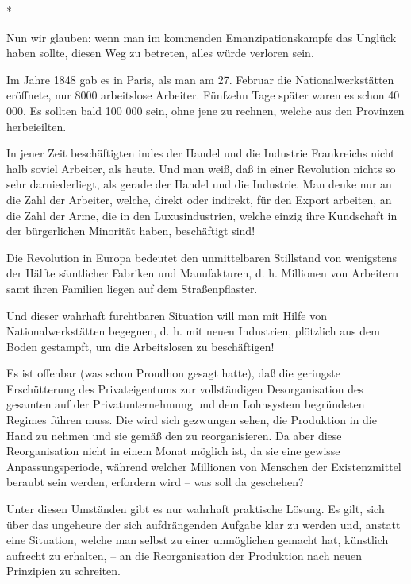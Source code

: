 \documentclass{scrbook}
\begin{document}
\begin{center}*\end{center}

Nun wir glauben: wenn man im kommenden Emanzipationskampfe das Unglück haben sollte, diesen Weg zu betreten, alles würde verloren sein.

Im Jahre 1848 gab es in Paris, als man am 27. Februar die Nationalwerkstätten eröffnete, nur 8000 arbeitslose Arbeiter. Fünfzehn Tage später waren es schon 40 000. Es sollten bald 100 000 sein, ohne jene zu rechnen, welche aus den Provinzen herbeieilten.

In jener Zeit beschäftigten indes der Handel und die Industrie Frankreichs nicht halb soviel Arbeiter, als heute. Und man weiß, daß in einer Revolution nichts so sehr darniederliegt, als gerade der Handel und die Industrie. Man denke nur an die Zahl der Arbeiter, welche, direkt oder indirekt, für den Export arbeiten, an die Zahl der Arme, die in den Luxusindustrien, welche einzig ihre Kundschaft in der bürgerlichen Minorität haben, beschäftigt sind!

Die Revolution in Europa bedeutet den unmittelbaren Stillstand von wenigstens der Hälfte sämtlicher Fabriken und Manufakturen, d. h. Millionen von Arbeitern samt ihren Familien liegen auf dem Straßenpflaster.

Und dieser wahrhaft furchtbaren Situation will man mit Hilfe von Nationalwerkstätten begegnen, d. h. mit neuen Industrien, plötzlich aus dem Boden gestampft, um die Arbeitslosen zu beschäftigen!

Es ist offenbar (was schon Proudhon gesagt hatte), daß die geringste Erschütterung des Privateigentums zur vollständigen Desorganisation des gesamten auf der Privatunternehmung und dem Lohnsystem begründeten Regimes führen muss. Die  wird sich gezwungen sehen, die  Produktion  in die Hand zu nehmen und sie gemäß den  zu reorganisieren. Da aber diese Reorganisation nicht in einem Monat möglich ist, da sie eine gewisse Anpassungsperiode, während welcher Millionen von Menschen der Existenzmittel beraubt sein werden, erfordern wird – was soll da geschehen?

Unter diesen Umständen gibt es nur  wahrhaft praktische Lösung. Es gilt, sich über das ungeheure der sich aufdrängenden Aufgabe klar zu werden und, anstatt eine Situation, welche man selbst zu einer unmöglichen gemacht hat, künstlich aufrecht zu erhalten, – an die Reorganisation der Produktion nach neuen Prinzipien zu schreiten.
\end{document}
